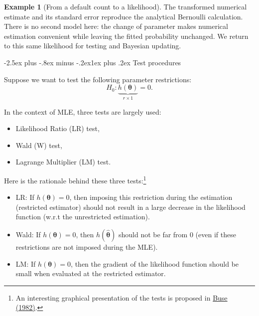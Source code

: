 \documentclass[
  11pt,
]{book}
\makeatletter
\providecommand{\tightlist}{%
  \setlength{\itemsep}{0pt}\setlength{\parskip}{0pt}}
\renewcommand\subsection{\@startsection{subsection}{2}{\z@}
  {-2.5ex plus -.8ex minus -.2ex}{1ex plus .2ex}
  {\normalfont\large\bfseries\color{TextbookInk}}}
\theoremstyle{definition}
\theoremstyle{definition}
\newtheorem{example}{Example}[chapter]
\theoremstyle{definition}
\theoremstyle{definition}
\theoremstyle{remark}
\makeatother
\begin{document}
\begin{example}[From a default count to a likelihood]
\begin{table}[H]
\centering\begingroup\fontsize{10}{12}\selectfont

\endgroup{}
\end{table}

The transformed numerical estimate and its standard error reproduce the analytical Bernoulli calculation. There is no second model here: the change of parameter makes numerical estimation convenient while leaving the fitted probability unchanged. We return to this same likelihood for testing and Bayesian updating.
\end{example}

\subsection{Test procedures}\label{TestMLE}

Suppose we want to test the following parameter restrictions:
\begin{equation}
\boxed{H_0: \underbrace{h(\boldsymbol\theta)}_{r \times 1}=0.}
\end{equation}

In the context of MLE, three tests are largely used:

\begin{itemize}
\tightlist
\item
  Likelihood Ratio (LR) test,
\item
  Wald (W) test,
\item
  Lagrange Multiplier (LM) test.
\end{itemize}

Here is the rationale behind these three tests:\footnote{An interesting graphical presentation of the tests is proposed in \href{http://hedibert.org/wp-content/uploads/2014/04/LR-W-LM-Tests-Buse1982.pdf}{Buse (1982)}.}

\begin{itemize}
\tightlist
\item
  LR: If \(h(\boldsymbol\theta)=0\), then imposing this restriction during the estimation (restricted estimator) should not result in a large decrease in the likelihood function (w.r.t the unrestricted estimation).
\item
  Wald: If \(h(\boldsymbol\theta)=0\), then \(h(\hat{\boldsymbol\theta})\) should not be far from \(0\) (even if these restrictions are not imposed during the MLE).
\item
  LM: If \(h(\boldsymbol\theta)=0\), then the gradient of the likelihood function should be small when evaluated at the restricted estimator.
\end{itemize}
\end{document}
